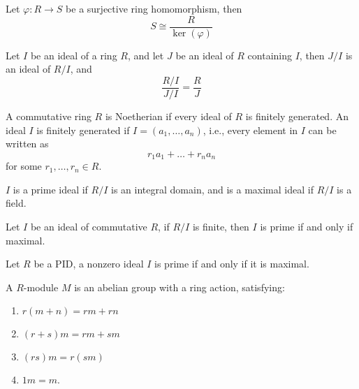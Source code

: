 \documentclass[openany]{book}
\begin{document}
\begin{thm}
    Let $\varphi:R\to S$ be a surjective ring homomorphism, then 
    \begin{equation*}
        S\cong\frac{R}{\ker(\varphi)}
    \end{equation*}
\end{thm}


\begin{prop}
    Let $I$ be an ideal of a ring $R$, and let $J$ be an ideal of $R$ containing $I$, then $J/I$ is an ideal of $R/I$, and 
    \begin{equation*}
        \frac{R/I}{J/I}=\frac{R}{J}
    \end{equation*}
\end{prop}


\begin{defn}[Noetherian]
    A commutative ring $R$ is Noetherian if every ideal of $R$ is finitely generated. An ideal $I$ is finitely generated if $I=(a_1,\dots,a_n)$, i.e., every element in $I$ can be written as 
    \begin{equation*}
        r_1a_1+\dots+r_na_n
    \end{equation*}
    for some $r_1,\dots, r_n\in R$.
\end{defn}

\begin{defn}
    $I$ is a prime ideal if $R/I$ is an integral domain, and is a maximal ideal if $R/I$ is a field.
\end{defn}

\begin{prop}
    Let $I$ be an ideal of commutative $R$, if $R/I$ is finite, then $I$ is prime if and only if maximal.
\end{prop}

\begin{prop}
    Let $R$ be a PID, a nonzero ideal $I$ is prime if and only if it is maximal.
\end{prop}

\begin{defn}[module]
    A $R$-module $M$ is an abelian group with a ring action, satisfying:
    \begin{enumerate}
        \item $r(m+n)=rm+rn$
        \item $(r+s)m=rm+sm$
        \item $(rs)m=r(sm)$
        \item $1m=m$.
    \end{enumerate}
\end{defn}
\end{document}
